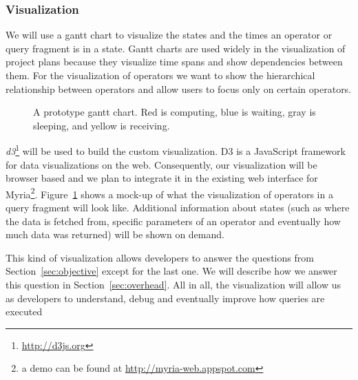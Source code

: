 \documentclass[11pt]{article}
\begin{document}

	\subsubsection{Visualization}

	We will use a gantt chart to visualize the states and the times an operator or query fragment is in a state. Gantt charts are used widely in the visualization of project plans because they visualize time spans and show dependencies between them. For the visualization of operators we want to show the hierarchical relationship between operators and allow users to focus only on certain operators.

\begin{figure}[h]
  \begin{center}
    \def\svgwidth{0.9\columnwidth}
    
  \end{center}
  \caption{A prototype gantt chart. Red is computing, blue is waiting, gray is sleeping, and yellow is receiving.}
  \label{fig:gantt}
\end{figure}

	\emph{d3}\footnote{\url{http://d3js.org}} will be used to build the custom visualization. D3 is a JavaScript framework for data visualizations on the web. Consequently, our visualization will be browser based and we plan to integrate it in the existing web interface for Myria\footnote{a demo can be found at \url{http://myria-web.appspot.com}}. Figure~\ref{fig:gantt} shows a mock-up of what the visualization of operators in a query fragment will look like. Additional information about states (such as where the data is fetched from, specific parameters of an operator and eventually how much data was returned) will be shown on demand.

	This kind of visualization allows developers to answer the questions from Section~\ref{sec:objective} except for the last one. We will describe how we answer this question in Section~\ref{sec:overhead}. All in all, the visualization will allow us as developers to understand, debug and eventually improve how queries are executed

\end{document}
